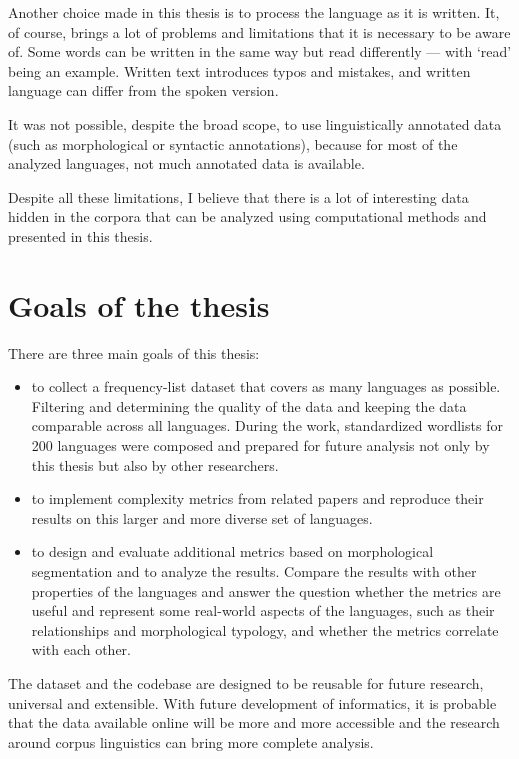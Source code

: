 Another choice made in this thesis is to process the language as it is written. It, of course, brings a lot of problems and limitations that it is necessary to be aware of. Some words can be written in the same way but read differently --- with `read' being an example. Written text introduces typos and mistakes, and written language can differ from the spoken version. 

It was not possible, despite the broad scope, to use linguistically annotated data (such as morphological or syntactic annotations), because for most of the analyzed languages, not much annotated data is available.


Despite all these limitations, I believe that there is a lot of interesting data hidden in the corpora that can be analyzed using computational methods and presented in this thesis. 

\section{Goals of the thesis}

There are three main goals of this thesis:
\begin{itemize}
    \item to collect a frequency-list dataset that covers as many languages as possible. Filtering and determining the quality of the data and keeping the data comparable across all languages. During the work, standardized wordlists for 200 languages were composed and prepared for future analysis not only by this thesis but also by other researchers.
    \item to implement complexity metrics from related papers and reproduce their results on this larger and more diverse set of languages.
    \item to design and evaluate additional metrics based on morphological segmentation and to analyze the results. Compare the results with other properties of the languages and answer the question whether the metrics are useful and represent some real-world aspects of the languages, such as their relationships and morphological typology, and whether the metrics correlate with each other.
\end{itemize}

The dataset and the codebase are designed to be reusable for future research, universal and extensible. With future development of informatics, it is probable that the data available online will be more and more accessible and the research around corpus linguistics can bring more complete analysis.

